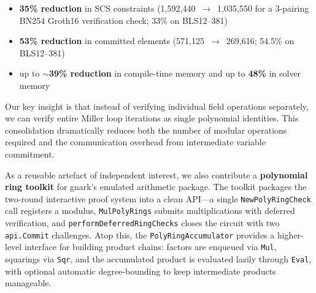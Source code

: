 \begin{itemize}
\item \textbf{35\% reduction} in SCS constraints (1,592,440~$\to$~1,035,550 for a 3-pairing BN254 Groth16 verification check; 33\% on BLS12--381)
\item \textbf{53\% reduction} in committed elements (571,125~$\to$~269,616; 54.5\% on BLS12--381)
\item up to $\sim$\textbf{39\% reduction} in compile-time memory and up to \textbf{48\%} in solver memory
\end{itemize}

Our key insight is that instead of verifying individual field operations separately, we can verify entire Miller loop iterations as single polynomial identities. This consolidation dramatically reduces both the number of modular operations required and the communication overhead from intermediate variable commitment.

As a reusable artefact of independent interest, we also contribute a \textbf{polynomial ring toolkit} for gnark's emulated arithmetic package. The toolkit packages the two-round interactive proof system into a clean API---a single \texttt{NewPolyRingCheck} call registers a modulus, \texttt{MulPolyRings} submits multiplications with deferred verification, and \texttt{performDeferredRingChecks} closes the circuit with two \texttt{api.Commit} challenges. Atop this, the \texttt{PolyRingAccumulator} provides a higher-level interface for building product chains: factors are enqueued via \texttt{Mul}, squarings via \texttt{Sqr}, and the accumulated product is evaluated lazily through \texttt{Eval}, with optional automatic degree-bounding to keep intermediate products manageable.
